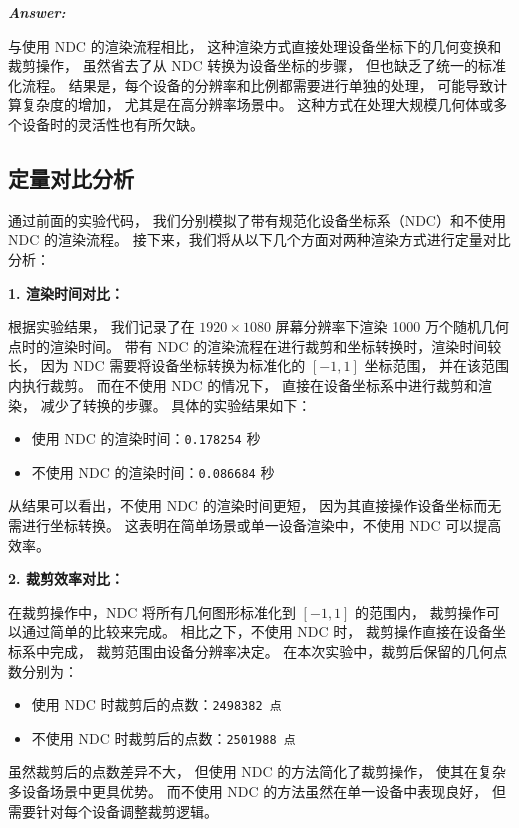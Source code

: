 \documentclass[12pt]{article}
\newenvironment{Answer}{
  \vspace{12pt}
  {\large\textbf{\textit{\hspace{-12pt}Answer:}}}\par
  \vspace{8pt}
} {\vspace{24pt}}
\begin{document}
\begin{Answer}
与使用 NDC 的渲染流程相比，
这种渲染方式直接处理设备坐标下的几何变换和裁剪操作，
虽然省去了从 NDC 转换为设备坐标的步骤，
但也缺乏了统一的标准化流程。
结果是，每个设备的分辨率和比例都需要进行单独的处理，
可能导致计算复杂度的增加，
尤其是在高分辨率场景中。
这种方式在处理大规模几何体或多个设备时的灵活性也有所欠缺。

\subsection*{定量对比分析}
\noindent

通过前面的实验代码，
我们分别模拟了带有规范化设备坐标系（NDC）和不使用 NDC 的渲染流程。
接下来，我们将从以下几个方面对两种渲染方式进行定量对比分析：

\noindent\textbf{1. 渲染时间对比：}

根据实验结果，
我们记录了在 $1920 \times 1080$ 屏幕分辨率下渲染 1000 万个随机几何点时的渲染时间。
带有 NDC 的渲染流程在进行裁剪和坐标转换时，渲染时间较长，
因为 NDC 需要将设备坐标转换为标准化的 $[-1, 1]$ 坐标范围，
并在该范围内执行裁剪。
而在不使用 NDC 的情况下，
直接在设备坐标系中进行裁剪和渲染，
减少了转换的步骤。
具体的实验结果如下：

\begin{itemize}
    \item 使用 NDC 的渲染时间：\texttt{0.178254} 秒
    \item 不使用 NDC 的渲染时间：\texttt{0.086684} 秒
\end{itemize}

从结果可以看出，不使用 NDC 的渲染时间更短，
因为其直接操作设备坐标而无需进行坐标转换。
这表明在简单场景或单一设备渲染中，不使用 NDC 可以提高效率。

\noindent\textbf{2. 裁剪效率对比：}

在裁剪操作中，NDC 将所有几何图形标准化到 $[-1, 1]$ 的范围内，
裁剪操作可以通过简单的比较来完成。
相比之下，不使用 NDC 时，
裁剪操作直接在设备坐标系中完成，
裁剪范围由设备分辨率决定。
在本次实验中，裁剪后保留的几何点数分别为：

\begin{itemize}
    \item 使用 NDC 时裁剪后的点数：\texttt{2498382 点}
    \item 不使用 NDC 时裁剪后的点数：\texttt{2501988 点}
\end{itemize}

虽然裁剪后的点数差异不大，
但使用 NDC 的方法简化了裁剪操作，
使其在复杂多设备场景中更具优势。
而不使用 NDC 的方法虽然在单一设备中表现良好，
但需要针对每个设备调整裁剪逻辑。


\end{Answer}
\end{document}
